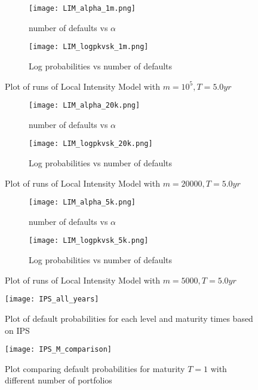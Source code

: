 \begin{figure}
	\centering
	\begin{subfigure}{.5\textwidth}
  \centering
  \texttt{[image: LIM\_alpha\_1m.png]}
  \caption{number of defaults vs $\alpha$}
\end{subfigure}%
\begin{subfigure}{.5\textwidth}
  \centering
  \texttt{[image: LIM\_logpkvsk\_1m.png]}
 \caption{Log probabilities vs number of defaults}
\end{subfigure}
	\caption{Plot of runs of Local Intensity Model with $m=10^{5}, T=5.0yr$}
	\label{fig:LIM_1m}
\end{figure}

\begin{figure}
	\centering
	\begin{subfigure}{.5\textwidth}
  \centering
  \texttt{[image: LIM\_alpha\_20k.png]}
  \caption{number of defaults vs $\alpha$}
\end{subfigure}%
\begin{subfigure}{.5\textwidth}
  \centering
  \texttt{[image: LIM\_logpkvsk\_20k.png]}
 \caption{Log probabilities vs number of defaults}
\end{subfigure}
	\caption{Plot of runs of Local Intensity Model with $m=20000, T=5.0yr$}
	\label{fig:LIM_20k}
\end{figure}

\begin{figure}[H]
	\centering
	\begin{subfigure}{.5\textwidth}
  \centering
  \texttt{[image: LIM\_alpha\_5k.png]}
  \caption{number of defaults vs $\alpha$}
\end{subfigure}%
\begin{subfigure}{.5\textwidth}
  \centering
  \texttt{[image: LIM\_logpkvsk\_5k.png]}
 \caption{Log probabilities vs number of defaults}
\end{subfigure}

	\caption{Plot of runs of Local Intensity Model with $m=5000, T=5.0yr$}
	\label{fig:LIM_5k}
\end{figure}

\begin{figure}
	\centering
	\texttt{[image: IPS\_all\_years]}
	\caption{Plot of default probabilities for each level and maturity times
	based on IPS}
	\label{fig:IPS_all}
\end{figure}

\begin{figure}
	\centering
	\texttt{[image: IPS\_M\_comparison]}
	\caption{Plot comparing default probabilities for maturity $T=1$ with
	different number of portfolios}
	\label{fig:IPS_comparison}
\end{figure}


